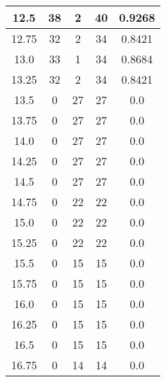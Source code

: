 \documentclass[letterpaper, 12pt]{article}
\begin{document}
\begin{longtable}{|c|c|c|c|c|}
12.5 & 38 & 2 & 40 & 0.9268 \\
\hline
12.75 & 32 & 2 & 34 & 0.8421 \\
\hline
13.0 & 33 & 1 & 34 & 0.8684 \\
\hline
13.25 & 32 & 2 & 34 & 0.8421 \\
\hline
13.5 & 0 & 27 & 27 & 0.0 \\
\hline
13.75 & 0 & 27 & 27 & 0.0 \\
\hline
14.0 & 0 & 27 & 27 & 0.0 \\
\hline
14.25 & 0 & 27 & 27 & 0.0 \\
\hline
14.5 & 0 & 27 & 27 & 0.0 \\
\hline
14.75 & 0 & 22 & 22 & 0.0 \\
\hline
15.0 & 0 & 22 & 22 & 0.0 \\
\hline
15.25 & 0 & 22 & 22 & 0.0 \\
\hline
15.5 & 0 & 15 & 15 & 0.0 \\
\hline
15.75 & 0 & 15 & 15 & 0.0 \\
\hline
16.0 & 0 & 15 & 15 & 0.0 \\
\hline
16.25 & 0 & 15 & 15 & 0.0 \\
\hline
16.5 & 0 & 15 & 15 & 0.0 \\
\hline
16.75 & 0 & 14 & 14 & 0.0 \\
\hline
\end{longtable}
\end{document}
